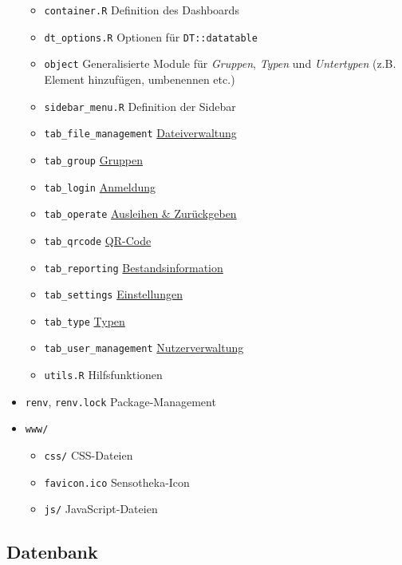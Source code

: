 \documentclass[
]{article}
\providecommand{\tightlist}{%
  \setlength{\itemsep}{0pt}\setlength{\parskip}{0pt}}
\begin{document}
\begin{itemize}
  \begin{itemize}
  \tightlist
  \item
    \texttt{container.R} Definition des Dashboards
  \item
    \texttt{dt\_options.R} Optionen für \texttt{DT::datatable}
  \item
    \texttt{object} Generalisierte Module für \emph{Gruppen}, \emph{Typen} und \emph{Untertypen} (z.B. Element hinzufügen, umbenennen etc.)
  \item
    \texttt{sidebar\_menu.R} Definition der Sidebar
  \item
    \texttt{tab\_file\_management} \protect\hyperlink{file-management}{Dateiverwaltung}
  \item
    \texttt{tab\_group} \protect\hyperlink{groups}{Gruppen}
  \item
    \texttt{tab\_login} \protect\hyperlink{login}{Anmeldung}
  \item
    \texttt{tab\_operate} \protect\hyperlink{operate}{Ausleihen \& Zurückgeben}
  \item
    \texttt{tab\_qrcode} \protect\hyperlink{qrcode}{QR-Code}
  \item
    \texttt{tab\_reporting} \protect\hyperlink{reporting}{Bestandsinformation}
  \item
    \texttt{tab\_settings} \protect\hyperlink{settings}{Einstellungen}
  \item
    \texttt{tab\_type} \protect\hyperlink{type}{Typen}
  \item
    \texttt{tab\_user\_management} \protect\hyperlink{user-management}{Nutzerverwaltung}
  \item
    \texttt{utils.R} Hilfsfunktionen
  \end{itemize}
\item
  \texttt{renv}, \texttt{renv.lock} Package-Management
\item
  \texttt{www/}

  \begin{itemize}
  \tightlist
  \item
    \texttt{css/} CSS-Dateien
  \item
    \texttt{favicon.ico} Sensotheka-Icon
  \item
    \texttt{js/} JavaScript-Dateien
  \end{itemize}
\end{itemize}

\hypertarget{database}{%
\subsection{Datenbank}\label{database}}
\end{document}
